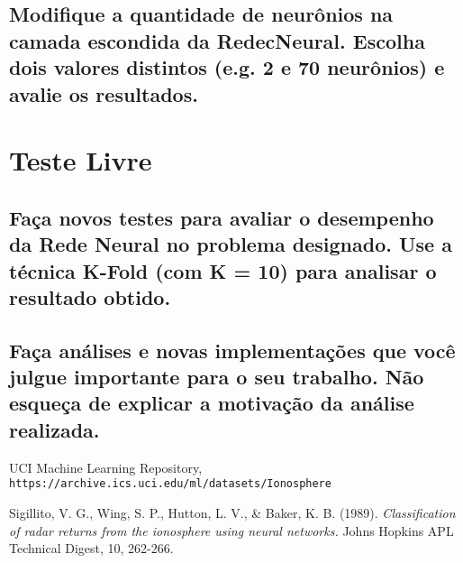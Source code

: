 \documentclass[12pt]{article}
\begin{document}
\subsection{Modifique a quantidade de neurônios na camada escondida da RedecNeural. Escolha dois valores distintos (e.g. 2 e 70 neurônios) e avalie os	resultados.}


\section{Teste Livre}

\subsection{Faça novos testes para avaliar o desempenho da Rede Neural no	problema designado. Use a técnica K-Fold (com K = 10) para analisar o	resultado obtido.}

\subsection{Faça análises e novas implementações que você julgue importante para o seu trabalho. Não esqueça de explicar a motivação da análise realizada.}


\begin{thebibliography}{99} 
	
	UCI Machine Learning Repository,\\ \texttt{https://archive.ics.uci.edu/ml/datasets/Ionosphere}
	
	 Sigillito, V. G., Wing, S. P., Hutton, L. V., \& Baker, K. B. (1989). \textit{Classification of radar returns from the ionosphere using neural networks.} Johns Hopkins APL Technical Digest, 10, 262-266.
	
	
	
	
	
	
\end{thebibliography}
\end{document}
